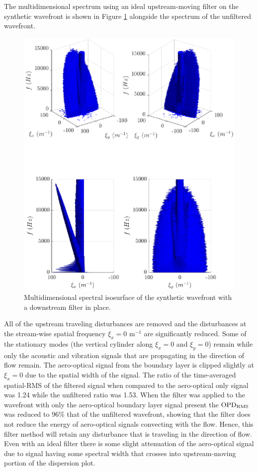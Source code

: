 The multidimensional spectrum using an ideal upstream-moving filter on the synthetic wavefront is shown in Figure \ref{fig:06_filter_downstream} alongside the spectrum of the unfiltered wavefront.
\begin{figure}
 \centering
 \includegraphics{../matlab/06_single_sensor_filtering/filter_downstream.eps}
 \caption{Multidimensional spectral isosurface of the synthetic wavefront with a downstream filter in place.}
 \label{fig:06_filter_downstream}
\end{figure}
All of the upstream traveling disturbances are removed and the disturbances at the stream-wise spatial frequency $\xi_x=0$ m$^{-1}$ are significantly reduced.
Some of the stationary modes (the vertical cylinder along $\xi_x=0$ and $\xi_y=0$) remain while only the acoustic and vibration signals that are propagating in the direction of flow remain.
The aero-optical signal from the boundary layer is clipped slightly at $\xi_x=0$ due to the spatial width of the signal.
The ratio of the time-averaged spatial-RMS of the filtered signal when compared to the aero-optical only signal was 1.24 while the unfiltered ratio was 1.53.
When the filter was applied to the wavefront with only the aero-optical boundary layer signal present the $\operatorname{OPD_{RMS}}$ was reduced to 96\% that of the unfiltered wavefront, showing that the filter does not reduce the energy of aero-optical signals convecting with the flow.
Hence, this filter method will retain any disturbance that is traveling in the direction of flow.
Even with an ideal filter there is some slight attenuation of the aero-optical signal due to signal having some spectral width that crosses into upstream-moving portion of the dispersion plot.


